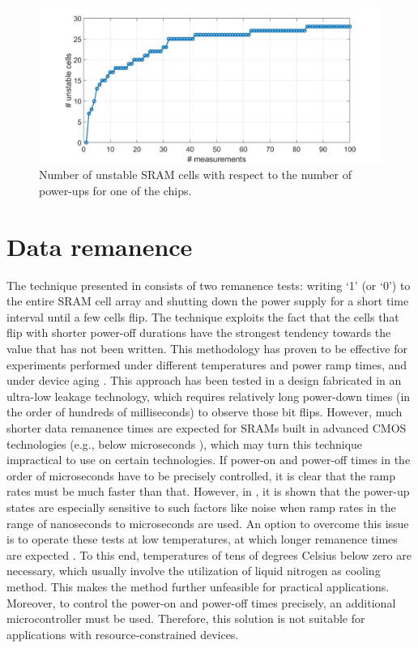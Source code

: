 \begin{figure}[H]
    \centering
    \includegraphics[width=16.5cm]{images/unstalbe_me.jpg}
    \caption{Number of unstable SRAM cells with respect to the number of power-ups for one of the chips. }
    \label{fig:unstable_me}
\end{figure}

\section{Data remanence}

The technique presented in \cite{Liu2017} consists of two remanence tests: writing ‘1’ (or ‘0’) to the entire SRAM cell array and shutting down the power supply for a short time interval until a few cells flip. The technique exploits the fact that the cells that flip with shorter power-off durations have the strongest tendency towards the value that has not been written. This methodology has proven to be effective for experiments performed under different temperatures and power ramp times, and under device aging \cite{Liu2017}. This approach has been tested in a design fabricated in an ultra-low leakage technology, which requires relatively long power-down times (in the order of hundreds of milliseconds) to observe those bit flips. However, much shorter data remanence times are expected for SRAMs built in advanced CMOS technologies (e.g., below microseconds \cite{Liu2017}), which may turn this technique impractical to use on certain technologies. If power-on and power-off times in the order of microseconds have to be precisely controlled, it is clear that the ramp rates must be much faster than that. However, in \cite{Wang2018}, it is shown that the power-up states are especially sensitive to such factors like noise when ramp rates in the range of nanoseconds to microseconds are used. An option to overcome this issue is to operate these tests at low temperatures, at which longer remanence times are expected \cite{Anagnostopoulos2018}. To this end, temperatures of tens of degrees Celsius below zero are necessary, which usually involve the utilization of liquid nitrogen as cooling method. This makes the method further unfeasible for practical applications. Moreover, to control the power-on and power-off times precisely, an additional microcontroller must be used. Therefore, this solution is not suitable for applications with resource-constrained devices.


